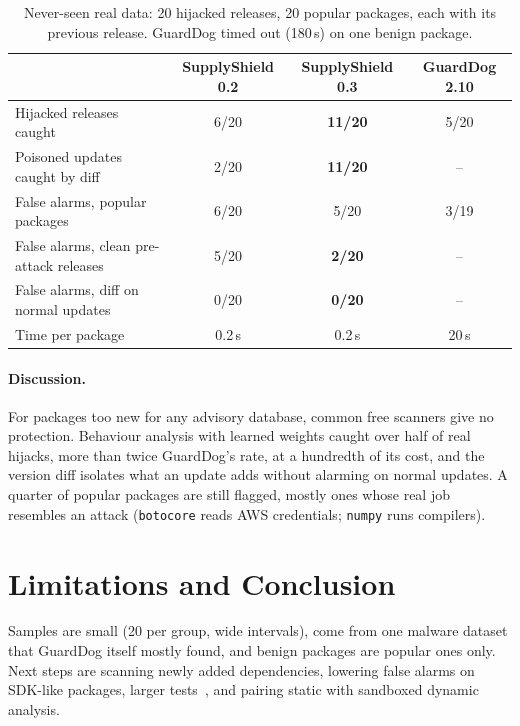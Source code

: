 \documentclass[runningheads]{llncs}
\begin{document}
\begin{table}[t]
\centering
\caption{Never-seen real data: 20 hijacked releases, 20 popular packages, each with its previous release. GuardDog timed out (180\,s) on one benign package.}
\label{tab:real}
\setlength{\tabcolsep}{4pt}
\begin{tabular}{lccc}
\toprule
 & SupplyShield 0.2 & \textbf{SupplyShield 0.3} & GuardDog 2.10 \\
\midrule
Hijacked releases caught & 6/20 & \textbf{11/20} & 5/20 \\
Poisoned updates caught by diff & 2/20 & \textbf{11/20} & -- \\
False alarms, popular packages & 6/20 & 5/20 & 3/19 \\
False alarms, clean pre-attack releases & 5/20 & \textbf{2/20} & -- \\
False alarms, diff on normal updates & 0/20 & \textbf{0/20} & -- \\
Time per package & 0.2\,s & 0.2\,s & 20\,s \\
\bottomrule
\end{tabular}
\end{table}

\paragraph{Discussion.} For packages too new for any advisory database, common free scanners give no protection. Behaviour analysis with learned weights caught over half of real hijacks, more than twice GuardDog's rate, at a hundredth of its cost, and the version diff isolates what an update adds without alarming on normal updates. A quarter of popular packages are still flagged, mostly ones whose real job resembles an attack (\texttt{botocore} reads AWS credentials; \texttt{numpy} runs compilers).

\section{Limitations and Conclusion}

Samples are small (20 per group, wide intervals), come from one malware dataset that GuardDog itself mostly found, and benign packages are popular ones only. Next steps are scanning newly added dependencies, lowering false alarms on SDK-like packages, larger tests~\cite{ohm2020backstabber}, and pairing static with sandboxed dynamic analysis.
\end{document}
